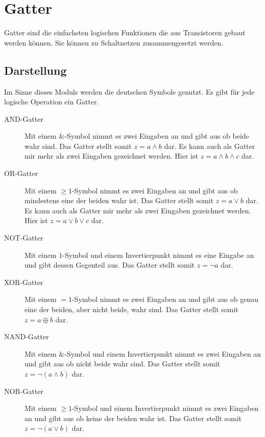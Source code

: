 \documentclass{article}
\begin{document}
\section{Gatter}
Gatter sind die einfachsten logischen Funktionen die aus Transistoren gebaut werden können. Sie können zu Schaltnetzen zusammengesetzt werden.

\subsection{Darstellung}
Im Sinne dieses Moduls werden die deutschen Symbole genutzt. Es gibt für jede logische Operation ein Gatter.
\begin{description}
 \item[AND-Gatter] Mit einem $\&$-Symbol nimmt es zwei Eingaben an und gibt aus ob beide wahr sind.
Das Gatter stellt somit $z = a \land b$ dar.
Es kann auch als Gatter mir mehr als zwei Eingaben gezeichnet werden. Hier ist \zb $z = a \land b \land c$ dar.
 \item[OR-Gatter] Mit einem $\ge 1$-Symbol nimmt es zwei Eingaben an und gibt aus ob mindestens eine der beiden wahr ist.
Das Gatter stellt somit $z = a \lor b$ dar.
Es kann auch als Gatter mir mehr als zwei Eingaben gezeichnet werden. Hier ist \zb $z = a \lor b \lor c$ dar.
 \item[NOT-Gatter] Mit einem $1$-Symbol und einem Invertierpunkt nimmt es eine Eingabe an und gibt dessen Gegenteil aus.
Das Gatter stellt somit $z = \neg a$ dar.
 \item[XOR-Gatter] Mit einem $=1$-Symbol nimmt es zwei Eingaben an und gibt aus ob genau eine der beiden, aber nicht beide, wahr sind.
Das Gatter stellt somit $z = a \oplus b$ dar.
 \item[NAND-Gatter] Mit einem $\&$-Symbol und einem Invertierpunkt nimmt es zwei Eingaben an und gibt aus ob nicht beide wahr sind.
Das Gatter stellt somit $z = \neg (a \land b)$ dar.
 \item[NOR-Gatter] Mit einem $\ge 1$-Symbol und einem Invertierpunkt nimmt es zwei Eingaben an und gibt aus ob keine der beiden wahr ist.
Das Gatter stellt somit $z = \neg (a \lor b)$ dar.
\end{description}
\end{document}
